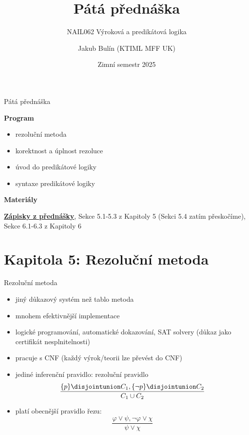 \documentclass{beamer}
\title{Pátá přednáška}
\subtitle{NAIL062 Výroková a predikátová logika}
\author{Jakub Bulín (KTIML MFF UK)}
\date{Zimní semestr 2025}
\begin{document}
\maketitle


\begin{frame}{Pátá přednáška}

    \textbf{Program}
        \begin{itemize}
            \item rezoluční metoda
            \item korektnost a úplnost rezoluce
            \item úvod do predikátové logiky
            \item syntaxe predikátové logiky
        \end{itemize}

    \textbf{Materiály}

        \href{https://github.com/jbulin-mff-uk/nail062/raw/main/lecture/lecture-notes/lecture-notes.pdf}{\alert{\textbf{Zápisky z přednášky}}}, Sekce 5.1-5.3 z Kapitoly 5 (Sekci 5.4 zatím přeskočíme), Sekce 6.1-6.3 z Kapitoly 6

\end{frame}


\section{\sc Kapitola 5: Rezoluční metoda}


\begin{frame}{Rezoluční metoda}
    
    \begin{itemize}[<+->]
        \item jiný důkazový systém než tablo metoda
        \item mnohem efektivnější implementace
        \item logické programování, automatické dokazování, SAT solvery (důkaz jako \alert{certifikát} nesplnitelnosti)
        \item pracuje s CNF (každý výrok/teorii lze převést do CNF)
        \item jediné inferenční pravidlo: \alert{rezoluční pravidlo}
        $$
        \frac{\{p\}\disjointunion C_1,\{\neg p\}\disjointunion C_2}{C_1\cup C_2}
        $$
        \item platí obecnější \alert{pravidlo řezu}:
        $$
        \frac{\varphi\lor\psi,\neg\varphi\lor\chi}{\psi\lor\chi}
        $$
    \end{itemize}

\end{frame}
\end{document}
